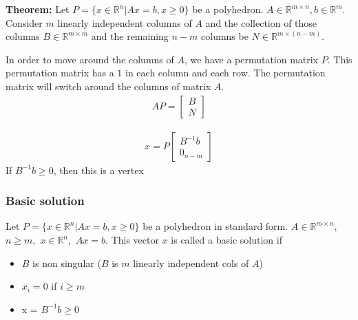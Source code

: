 \textbf{Theorem: } Let $P = \{ x \in \mathbb{R}^n | Ax = b, x \geq 0 \}$ be a polyhedron.
$A \in \mathbb{R}^{m \times n}, b \in \mathbb{R}^m$. 
Consider $m$ linearly independent columns of $A$ and the collection of those columns $B \in \mathbb{R}^{m \times m}$ and 
the remaining $n-m$ columns be $N \in \mathbb{R}^{m \times (n-m)}$. 

In order to move around the columns of $A$, we have a permutation matrix $P$.
This permutation matrix has a $1$ in each column and each row.
The permutation matrix will switch around the columns of matrix $A$.
\begin{align}
  AP = 
  \begin{bmatrix}
    B \\
    N
  \end{bmatrix}
\end{align}

\begin{align}
  x = P
  \begin{bmatrix}
     B^{-1} b \\
     0_{n-m}
  \end{bmatrix}
\end{align}
If $B^{-1} b \geq 0$, then this is a vertex
\subsubsection{Basic solution}
Let $P = \{ x \in \mathbb{R}^n | Ax = b, x \geq 0 \}$ be a polyhedron in standard form.
$A \in \mathbb{R}^{m \times n},$ 
$n \geq m,$
$x \in \mathbb{R}^n,$
$ Ax = b$.
This vector $x$ is called a basic solution if 
\begin{itemize}
  \item $B$ is non singular ($B$ is $m$ linearly independent cols of $A$)
  \item $x_i = 0$ if $i \geq m$
  \item x = $B^{-1} b \geq 0$
\end{itemize}

